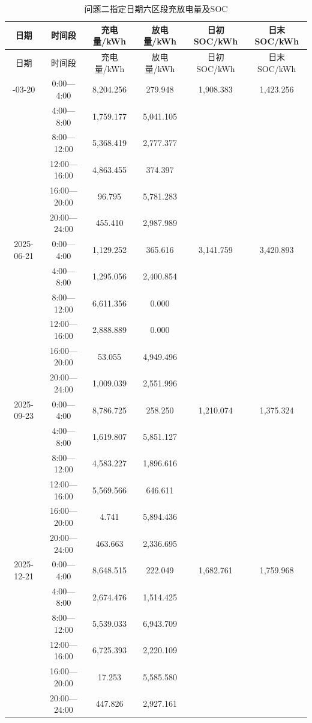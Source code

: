\documentclass[zihao=-4,a4paper,UTF8,fontset=none]{ctexart}
\begin{document}
\begin{longtable}[]{@{}cccccc@{}}
\caption{问题二指定日期六区段充放电量及SOC}\label{tab:appendix-B-1}\tabularnewline
\toprule\noalign{}
日期 & 时间段 & 充电量/kWh & 放电量/kWh & 日初SOC/kWh & 日末SOC/kWh \\
\midrule\noalign{}
\endfirsthead
\toprule\noalign{}
日期 & 时间段 & 充电量/kWh & 放电量/kWh & 日初SOC/kWh & 日末SOC/kWh \\
\midrule\noalign{}
\endhead
\bottomrule\noalign{}
\endlastfoot
2025-03-20 & 0:00---4:00 & 8,204.256 & 279.948 & 1,908.383 & 1,423.256 \\
& 4:00---8:00 & 1,759.177 & 5,041.105 & & \\
& 8:00---12:00 & 5,368.419 & 2,777.377 & & \\
& 12:00---16:00 & 4,863.455 & 374.397 & & \\
& 16:00---20:00 & 96.795 & 5,781.283 & & \\
& 20:00---24:00 & 455.410 & 2,987.989 & & \\
2025-06-21 & 0:00---4:00 & 1,129.252 & 365.616 & 3,141.759 & 3,420.893 \\
& 4:00---8:00 & 1,295.056 & 2,400.854 & & \\
& 8:00---12:00 & 6,611.356 & 0.000 & & \\
& 12:00---16:00 & 2,888.889 & 0.000 & & \\
& 16:00---20:00 & 53.055 & 4,949.496 & & \\
& 20:00---24:00 & 1,009.039 & 2,551.996 & & \\
2025-09-23 & 0:00---4:00 & 8,786.725 & 258.250 & 1,210.074 & 1,375.324 \\
& 4:00---8:00 & 1,619.807 & 5,851.127 & & \\
& 8:00---12:00 & 4,583.227 & 1,896.616 & & \\
& 12:00---16:00 & 5,569.566 & 646.611 & & \\
& 16:00---20:00 & 4.741 & 5,894.436 & & \\
& 20:00---24:00 & 463.663 & 2,336.695 & & \\
2025-12-21 & 0:00---4:00 & 8,648.515 & 222.049 & 1,682.761 & 1,759.968 \\
& 4:00---8:00 & 2,674.476 & 1,514.425 & & \\
& 8:00---12:00 & 5,539.033 & 6,943.709 & & \\
& 12:00---16:00 & 6,725.393 & 2,220.109 & & \\
& 16:00---20:00 & 17.253 & 5,585.580 & & \\
& 20:00---24:00 & 447.826 & 2,927.161 & & \\
\end{longtable}
\end{document}
